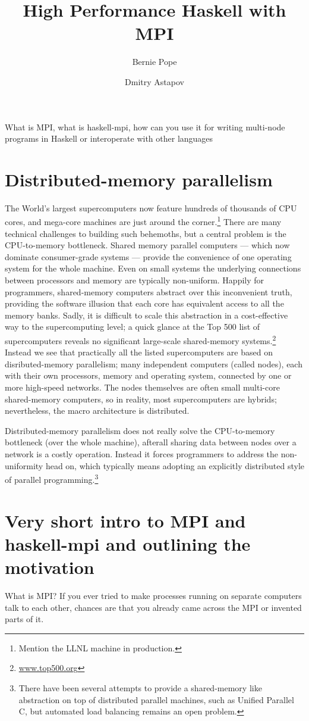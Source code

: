 \documentclass{tmr}
\title{High Performance Haskell with MPI}
\author{Bernie Pope\email{bjpope@unimelb.edu.au}}
\author{Dmitry Astapov\email{dastapov@gmail.com}}
\begin{document}
\begin{introduction} 
What is MPI, what is haskell-mpi, how can you use it for writing multi-node programs in Haskell or interoperate with other languages
\end{introduction}

\section{Distributed-memory parallelism}

The World's largest supercomputers now feature hundreds of thousands of CPU cores, and mega-core machines
are just around the corner.\footnote{Mention the LLNL machine in production.} There are many technical
challenges to building such behemoths, but a central problem is
the CPU-to-memory bottleneck. Shared memory parallel computers --- which now dominate consumer-grade
systems --- provide the convenience of one operating system for the whole machine. Even on small
systems the underlying connections between processors and memory are typically non-uniform. Happily for
programmers, shared-memory computers abstract over this inconvenient truth, providing the software
illusion that each core has equivalent access to all the memory banks.
Sadly, it is difficult to scale this abstraction in a
cost-effective way to the supercomputing level; a quick glance at the Top 500 list of supercomputers reveals
no significant large-scale shared-memory systems.\footnote{\url{www.top500.org}}
Instead we see that practically all the listed supercomputers are based on
disributed-memory parallelism; many independent computers (called nodes),
each with their own processors, memory and operating system, connected by one or more high-speed networks.
The nodes themselves are often small multi-core shared-memory computers, so in reality, most supercomputers
are hybrids; nevertheless, the macro architecture is distributed.

Distributed-memory parallelism does not really solve the CPU-to-memory bottleneck (over the whole machine),
afterall sharing data between nodes over a network is a costly operation. Instead it forces programmers to
address the non-uniformity head on, which typically means adopting an explicitly distributed style of
parallel programming.\footnote{There have been several attempts to provide a shared-memory like abstraction
on top of distributed parallel machines, such as Unified Parallel C, but automated load balancing remains
an open problem.} 

\section{Very short intro to MPI and haskell-mpi and outlining the motivation}
What is MPI? If you ever tried to make processes running on separate
computers talk to each other, chances are that you already came across
the MPI or invented parts of it. 
\end{document}
